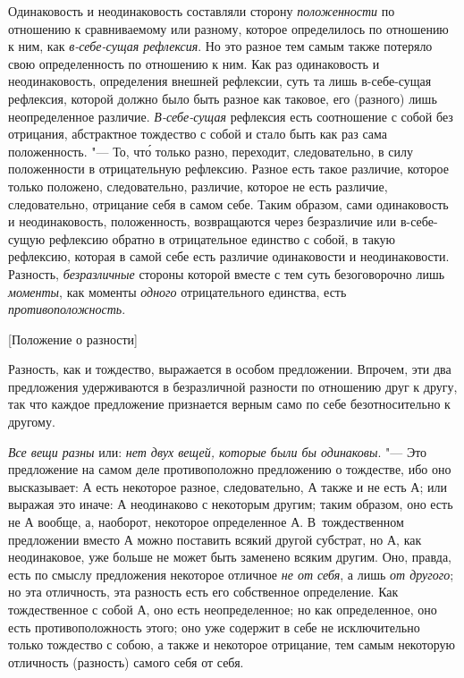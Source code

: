Одинаковость и неодинаковость составляли сторону
{\em положенности} по отношению к сравниваемому или
разному, которое определилось по отношению к ним, как
{\em в-себе-сущая рефлексия}. Но это разное тем самым
также потеряло свою определенность по отношению к ним. Как раз одинаковость
и неодинаковость, определения внешней рефлексии, суть та лишь в-себе-сущая
рефлексия, которой должно было быть разное как таковое, его (разного) лишь
неопределенное различие. {\em В-себе-сущая} рефлексия
есть соотношение с собой без отрицания, абстрактное тождество с собой и
стало быть как раз сама положенность. "--- То, чт\'{о} только разно, переходит,
следовательно, в силу положенности в отрицательную рефлексию. Разное есть
такое различие, которое только положено, следовательно, различие, которое
не есть различие, следовательно, отрицание себя в самом себе. Таким
образом, сами одинаковость и неодинаковость, положенность, возвращаются
через безразличие или в-себе-сущую рефлексию обратно в отрицательное
единство с собой, в такую рефлексию, которая в самой себе есть различие
одинаковости и неодинаковости. Разность,
{\em безразличные} стороны которой вместе с тем суть
безоговорочно лишь {\em моменты}, как моменты
{\em одного} отрицательного единства, есть {\em противоположность}.

%
  {[Положение о разности]}

Разность, как и тождество, выражается в особом предложении. Впрочем, эти два
предложения удерживаются в безразличной разности по отношению друг к другу,
так что каждое предложение признается верным само по себе безотносительно к
другому.

{\em Все вещи разны} или: {\em нет
двух вещей, которые были бы одинаковы}. "--- Это предложение на самом деле
противоположно предложению о тождестве, ибо оно высказывает: $А$
есть некоторое разное, следовательно, $А$ также и не есть
$А$; или выражая это иначе: $А$ неодинаково с некоторым
другим; таким образом, оно есть не $А$ вообще, а, наоборот,
некоторое определенное $А$. В~тождественном предложении вместо
$А$ можно поставить всякий другой субстрат, но $А$, как
неодинаковое, уже больше не может быть заменено всяким другим. Оно, правда,
есть по смыслу предложения некоторое отличное {\em не от себя},
а лишь {\em от другого}; но эта отличность,
эта разность есть его собственное определение. Как тождественное с собой
$А$, оно есть неопределенное; но как определенное, оно есть
противоположность этого; оно уже содержит в себе не исключительно только
тождество с собою, а также и некоторое отрицание, тем самым некоторую
отличность (разность) самого себя от себя.

